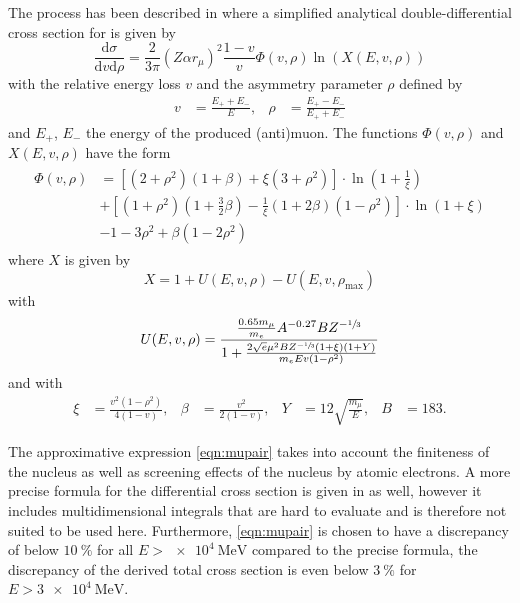 The process has been described in \cite{Kelner2000} where a simplified analytical double-differential cross section for is given by
\begin{equation}
    \label{eqn:mupair}
    \frac{\mathrm{d}\sigma}{\mathrm{d}v \mathrm{d}\rho} = \frac{2}{3\pi} (Z \alpha r_\mu)^2 \frac{1-v}{v} \Phi(v, \rho) \ln \left( X \left(E, v, \rho \right) \right)
\end{equation}
with the relative energy loss $v$ and the asymmetry parameter $\rho$ defined by
\begin{align}
    v &= \frac{E_+ + E_-}{E}, & \rho &= \frac{E_+ - E_-}{E_+ + E_-}
\end{align}
and $E_+$, $E_-$ the energy of the produced (anti)muon.
The functions $\Phi(v, \rho)$ and $X(E, v, \rho)$ have the form
\begin{align}
    \begin{split}
    \Phi(v, \rho) &= \left[ (2 + \rho^2) (1 + \beta) + \xi (3 + \rho^2) \right] \cdot \ln{ \left( 1 + \frac{1}{\xi} \right) }\\ &+ \left[ (1 + \rho^2) \left( 1 + \frac{3}{2} \beta \right) - \frac{1}{\xi} (1 + 2 \beta) (1 - \rho^2) \right] \cdot \ln{ (1 + \xi) }\\ &- 1 - 3 \rho^2 + \beta (1 - 2 \rho^2)
    \end{split}
\end{align}
where $X$ is given by
\begin{equation}
    X = 1 + U(E, v, \rho) - U(E, v, \rho_\text{max})
\end{equation}
with 
\begin{equation}
    U(E, v, \rho) = \frac{\frac{0.65 m_{\mu}}{m_e} A^{-0.27} B Z^{-\sfrac{1}{3}}}{1 + \frac{2 \sqrt{e} \mu^2 B Z^{-\sfrac{1}{3}} (1 + \xi) (1 + Y) }{m_e E v (1 - \rho^2)} }
\end{equation}
and with 
\begin{align}
    \xi &= \frac{v^2 (1 - \rho^2)}{4 (1 - v)}, & \beta &= \frac{v^2}{2 (1 - v)}, & Y &= 12 \sqrt{\frac{m_{\mu}}{E}}, & B &= 183.
\end{align}

The approximative expression \eqref{eqn:mupair} takes into account the finiteness of the nucleus as well as screening effects of the nucleus by atomic electrons.
A more precise formula for the differential cross section is given in \cite{Kelner2000} as well, however it includes multidimensional integrals that are hard to evaluate and is therefore not suited to be used here.
Furthermore, \eqref{eqn:mupair} is chosen to have a discrepancy of below $\SI{10}{\percent}$ for all $E > \SI{e4}{\mega\electronvolt}$ compared to the precise formula, the discrepancy of the derived total cross section is even below $\SI{3}{\percent}$ for $E > \SI{3e4}{\mega\electronvolt}$.

